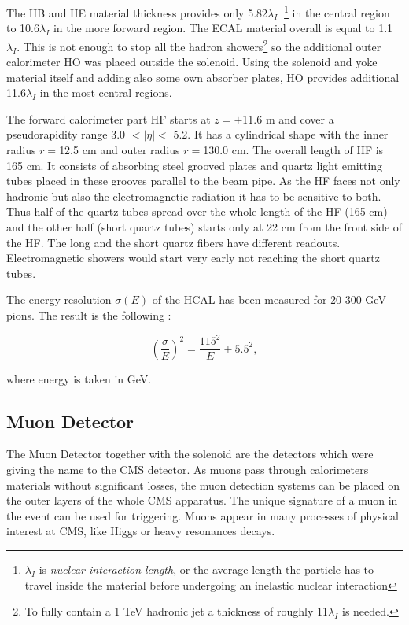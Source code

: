 The HB and HE material thickness provides only 5.82$\lambda_{I}\;\;$\footnote{$\lambda_{I}$ is \textit{nuclear interaction length}, or the average 
length the particle has to travel inside the material before undergoing an inelastic nuclear interaction} in the central region to 10.6$\lambda_{I}$ in the more forward
region. The ECAL material overall is equal to 1.1$\lambda_{I}$. This is not enough to stop all the hadron showers\footnote{To fully contain a 1 TeV hadronic jet a thickness of
roughly 11$\lambda_{I}$ is needed.} so the additional outer calorimeter HO
was placed outside the solenoid. Using the solenoid and yoke material itself and adding also some own absorber plates, HO provides additional 11.6$\lambda_{I}$ in the
most central regions.

The forward calorimeter part HF starts at $z = \pm$11.6 m and cover a pseudorapidity range  3.0 $ < |\eta| < $ 5.2. It has a cylindrical shape
with the inner radius $r = $12.5 cm and outer radius $r = $130.0 cm. The overall length of HF is 165 cm. It consists of absorbing steel grooved plates and
quartz light emitting tubes placed in these grooves parallel to the beam pipe. As the HF faces not only hadronic but also the electromagnetic radiation
it has to be sensitive to both. Thus half of the quartz tubes spread over the whole length of the HF (165 cm) and the other half (short quartz tubes) starts only at 22 cm 
from the front side of the HF. The long and the short quartz fibers have different readouts. Electromagnetic showers would start very early  not reaching the 
short quartz tubes.

The energy resolution $\sigma(E)$ of the HCAL has been measured for 20-300 GeV pions. The result is the following \cite{Elvira:800406}:

\begin{equation}
 (\frac{\sigma}{E})^{2} = \frac{115^{2}}{E} + 5.5^{2},
\end{equation}

where energy is taken in GeV.

\subsection{Muon Detector}\label{ssec:muonDet}

The Muon Detector\cite{CMSatLHC} together with the solenoid are the detectors which were giving the name to the CMS detector. As muons pass through calorimeters materials
without significant losses\cite{MuonStop}, the muon detection systems can be placed on the outer layers of the whole CMS apparatus.
The unique signature of a muon in the event can be used for triggering. Muons appear in many processes
of physical interest at CMS, like Higgs or heavy resonances decays.

